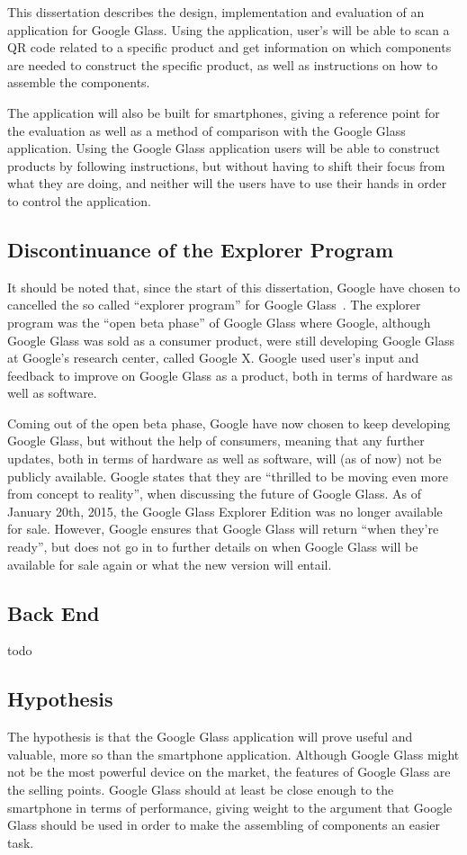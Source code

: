This dissertation describes the design, implementation and evaluation of an application for Google Glass. Using the application, user's will be able to scan a QR code related to a specific product and get information on which components are needed to construct the specific product, as well as instructions on how to assemble the components.

The application will also be built for smartphones, giving a reference point for the evaluation as well as a method of comparison with the Google Glass application. Using the Google Glass application users will be able to construct products by following instructions, but without having to shift their focus from what they are doing, and neither will the users have to use their hands in order to control the application.

\subsection{Discontinuance of the Explorer Program}
It should be noted that, since the start of this dissertation, Google have chosen to cancelled the so called ``explorer program'' for Google Glass~\cite{glassDiscontinued}. The explorer program was the ``open beta phase'' of Google Glass where Google, although Google Glass was sold as a consumer product, were still developing Google Glass at Google's research center, called Google X. Google used user's input and feedback to improve on Google Glass as a product, both in terms of hardware as well as software.

Coming out of the open beta phase, Google have now chosen to keep developing Google Glass, but without the help of consumers, meaning that any further updates, both in terms of hardware as well as software, will (as of now) not be publicly available. Google states that they are ``thrilled to be moving even more from concept to reality'', when discussing the future of Google Glass. As of January 20th, 2015, the Google Glass Explorer Edition was no longer available for sale. However, Google ensures that Google Glass will return ``when they're ready'', but does not go in to further details on when Google Glass will be available for sale again or what the new version will entail. 

\subsection{Back End}
todo

\subsection{Hypothesis}
The hypothesis is that the Google Glass application will prove useful and valuable, more so than the smartphone application. Although Google Glass might not be the most powerful device on the market, the features of Google Glass are the selling points. Google Glass should at least be close enough to the smartphone in terms of performance, giving weight to the argument that Google Glass should be used in order to make the assembling of components an easier task.

